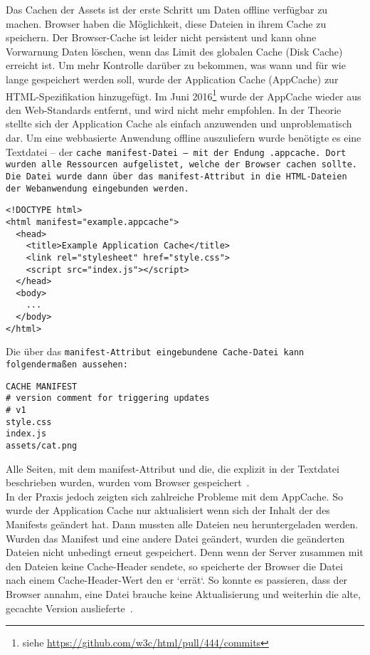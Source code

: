 Das Cachen der \gls{Assets} ist der erste Schritt um Daten offline verfügbar zu machen. Browser haben die Möglichkeit, diese Dateien in ihrem Cache zu speichern. Der Browser-Cache ist leider nicht persistent und kann ohne Vorwarnung Daten löschen, wenn das Limit des globalen Cache (Disk Cache) erreicht ist.
Um mehr Kontrolle darüber zu bekommen, was wann und für wie lange gespeichert werden soll, wurde der Application Cache (AppCache) zur HTML-Spezifikation hinzugefügt.
Im Juni 2016\footnote{siehe \url{https://github.com/w3c/html/pull/444/commits}} wurde der AppCache wieder aus den Web-Standards entfernt, und wird nicht mehr empfohlen.
In der Theorie stellte sich der Application Cache als einfach anzuwenden und unproblematisch dar. Um eine webbasierte Anwendung offline auszuliefern wurde benötigte es eine Textdatei -- der \tt{cache manifest}-Datei -- mit der Endung \tt{.appcache}. Dort wurden alle Ressourcen aufgelistet, welche der Browser cachen sollte.
Die Datei wurde dann über das \tt{manifest}-Attribut in die \gls{HTML}-Dateien der Webanwendung eingebunden werden.
\begin{lstlisting}
<!DOCTYPE html>
<html manifest="example.appcache">
  <head>
    <title>Example Application Cache</title>
    <link rel="stylesheet" href="style.css">
    <script src="index.js"></script>
  </head>
  <body>
    ...
  </body>
</html>
\end{lstlisting}
Die über das \tt{manifest}-Attribut eingebundene Cache-Datei kann folgendermaßen aussehen:
\begin{lstlisting}
CACHE MANIFEST
# version comment for triggering updates
# v1
style.css
index.js
assets/cat.png
\end{lstlisting}
Alle Seiten, mit dem manifest-Attribut und die, die explizit in der Textdatei beschrieben wurden, wurden vom Browser gespeichert~\cite{appcache}.\\
In der Praxis jedoch zeigten sich zahlreiche Probleme mit dem AppCache. So wurde der Application Cache nur aktualisiert wenn sich der Inhalt der des Manifests geändert hat. Dann mussten alle Dateien neu heruntergeladen werden.
Wurden das Manifest und eine andere Datei geändert, wurden die geänderten Dateien nicht unbedingt erneut gespeichert. Denn wenn der Server zusammen mit den Dateien keine Cache-Header sendete, so speicherte der Browser die Datei nach einem Cache-Header-Wert den er `errät`. So konnte es passieren, dass der Browser annahm, eine Datei brauche keine Aktualisierung und weiterhin die alte, gecachte Version auslieferte~\cite{noappcache}.\\
